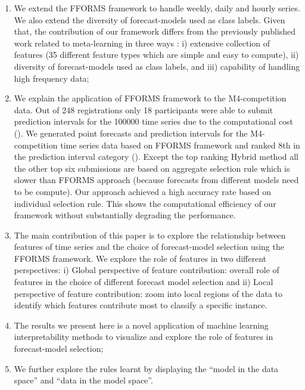 \documentclass[11pt,a4paper,]{article}
\providecommand{\tightlist}{%
  \setlength{\itemsep}{0pt}\setlength{\parskip}{0pt}}
\begin{document}
\begin{enumerate}
\def\labelenumi{\arabic{enumi}.}
\tightlist
\item
  We extend the FFORMS framework to handle weekly, daily and hourly
  series. We also extend the diversity of forecast-models used as class
  labels. Given that, the contribution of our framework differs from the
  previously published work related to meta-learning in three ways
  \autocites{prudencio2004meta}{lemke2010meta}{kuck2016meta}: i)
  extensive collection of features (35 different feature types which are
  simple and easy to compute), ii) diversity of forecast-models used as
  class labels, and iii) capability of handling high frequency data;
\item
  We explain the application of FFORMS framework to the M4-competition
  data. Out of 248 registrations only 18 participants were able to
  submit prediction intervals for the 100000 time series due to the
  computational cost (\textcite{Makridakis2018dx}). We generated point
  forecasts and prediction intervals for the M4-competition time series
  data based on FFORMS framework and ranked 8th in the prediction
  interval category (\textcite{Makridakis2018dx}). Except the top
  ranking Hybrid method all the other top six submissions are based on
  aggregate selection rule which is slower than FFORMS approach (because
  forecasts from different models need to be compute). Our approach
  achieved a high accuracy rate based on individual selection rule. This
  shows the computational efficiency of our framework without
  substantially degrading the performance.
\item
  The main contribution of this paper is to explore the relationship
  between features of time series and the choice of forecast-model
  selection using the FFORMS framework. We explore the role of features
  in two different perspectives: i) Global perspective of feature
  contribution: overall role of features in the choice of different
  forecast model selection and ii) Local perspective of feature
  contribution: zoom into local regions of the data to identify which
  features contribute most to classify a specific instance.
\item
  The results we present here is a novel application of machine learning
  interpretability methods to visualize and explore the role of features
  in forecast-model selection;
\item
  We further explore the rules learnt by displaying the ``model in the
  data space'' and ``data in the model space''.
\end{enumerate}
\end{document}
